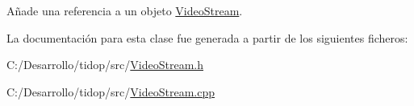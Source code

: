 Añade una referencia a un objeto \hyperlink{class_i3_d_1_1_video_stream}{Video\+Stream}. 



La documentación para esta clase fue generada a partir de los siguientes ficheros\+:\begin{DoxyCompactItemize}
\item 
C\+:/\+Desarrollo/tidop/src/\hyperlink{_video_stream_8h}{Video\+Stream.\+h}\item 
C\+:/\+Desarrollo/tidop/src/\hyperlink{_video_stream_8cpp}{Video\+Stream.\+cpp}\end{DoxyCompactItemize}

